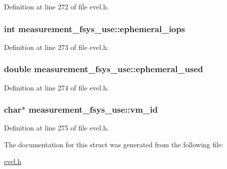 Definition at line 272 of file evel.\+h.

\hypertarget{structmeasurement__fsys__use_a7389ea2d9e7a81e449b77eede1a3c691}{}
\subsubsection[{ephemeral\+\_\+iops}]{\setlength{\rightskip}{0pt plus 5cm}int measurement\+\_\+fsys\+\_\+use\+::ephemeral\+\_\+iops}\label{structmeasurement__fsys__use_a7389ea2d9e7a81e449b77eede1a3c691}


Definition at line 273 of file evel.\+h.

\hypertarget{structmeasurement__fsys__use_a5b03b9de4fcc06f38446b20a0a1a6530}{}
\subsubsection[{ephemeral\+\_\+used}]{\setlength{\rightskip}{0pt plus 5cm}double measurement\+\_\+fsys\+\_\+use\+::ephemeral\+\_\+used}\label{structmeasurement__fsys__use_a5b03b9de4fcc06f38446b20a0a1a6530}


Definition at line 274 of file evel.\+h.

\hypertarget{structmeasurement__fsys__use_a7748b01aae2eba6e018deb88fc9d6726}{}
\subsubsection[{vm\+\_\+id}]{\setlength{\rightskip}{0pt plus 5cm}char$\ast$ measurement\+\_\+fsys\+\_\+use\+::vm\+\_\+id}\label{structmeasurement__fsys__use_a7748b01aae2eba6e018deb88fc9d6726}


Definition at line 275 of file evel.\+h.



The documentation for this struct was generated from the following file\+:\begin{DoxyCompactItemize}
\item 
\hyperlink{evel_8h}{evel.\+h}\end{DoxyCompactItemize}
